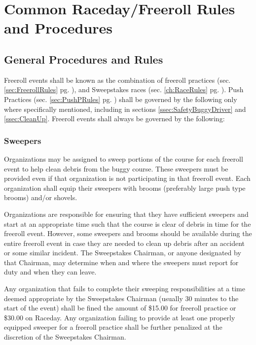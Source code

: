 \chapter{Common Raceday/Freeroll Rules and Procedures}
\label{ch:CommonRules}

\section{General Procedures and Rules}
	Freeroll events shall be known as the combination of freeroll practices (sec. \ref{sec:FreerollRules} pg. \pageref{sec:FreerollRules}), and Sweepstakes races (sec. \ref{ch:RaceRules} pg. \pageref{ch:RaceRules}). Push Practices (sec. \ref{sec:PushPRules} pg. \pageref{sec:PushPRules}) shall be governed by the following only where specifically mentioned, including in sections \ref{ssec:SafetyBuggyDriver} and \ref{ssec:CleanUp}. Freeroll events shall always be governed by the following:

\subsection{Sweepers}
\label{subsec:Sweepers}

	Organizations may be assigned to sweep portions of the course for each freeroll event to help clean debris from the buggy course. These sweepers must be provided even if that organization is not participating in that freeroll event. Each organization shall equip their sweepers with brooms (preferably large push type brooms) and/or shovels.

	Organizations are responsible for ensuring that they have sufficient sweepers and start at an appropriate time such that the course is clear of debris in time for the freeroll event. However, some sweepers and brooms should be available during the entire freeroll event in case they are needed to clean up debris after an accident or some similar incident. The Sweepstakes Chairman, or anyone designated by that Chairman, may determine when and where the sweepers must report for duty and when they can leave.

	Any organization that fails to complete their sweeping responsibilities at a time deemed appropriate by the Sweepstakes Chairman (usually 30 minutes to the start of the event) shall be fined the amount of \$15.00 for freeroll practice or \$30.00 on Raceday. Any organization failing to provide at least one properly equipped sweeper for a freeroll practice shall be further penalized at the discretion of the Sweepstakes Chairman.

